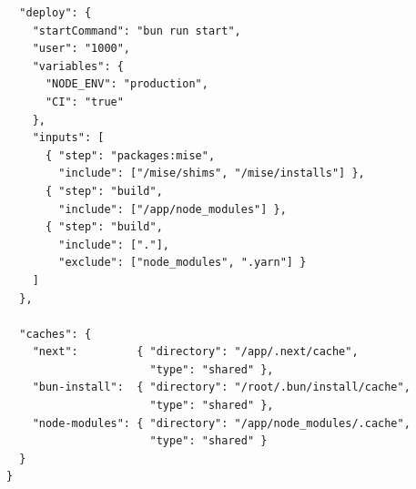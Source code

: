 \begin{longlisting}
\begin{mdframed}[
  linecolor=gray!40,
  backgroundcolor=gray!5,
  linewidth=0.5pt,
  innerleftmargin=6pt,
  innerrightmargin=6pt,
  innertopmargin=6pt,
  innerbottommargin=6pt,
  nobreak=false
]
\begin{verbatim}
  "deploy": {
    "startCommand": "bun run start",
    "user": "1000",
    "variables": {
      "NODE_ENV": "production",
      "CI": "true"
    },
    "inputs": [
      { "step": "packages:mise",
        "include": ["/mise/shims", "/mise/installs"] },
      { "step": "build",
        "include": ["/app/node_modules"] },
      { "step": "build",
        "include": ["."],
        "exclude": ["node_modules", ".yarn"] }
    ]
  },

  "caches": {
    "next":         { "directory": "/app/.next/cache",
                      "type": "shared" },
    "bun-install":  { "directory": "/root/.bun/install/cache",
                      "type": "shared" },
    "node-modules": { "directory": "/app/node_modules/.cache",
                      "type": "shared" }
  }
}
\end{verbatim}
\end{mdframed}
\caption{Extrait du plan \texttt{railpack-plan.json} -- Partie 2 : configuration de deploiement et caches}
\label{lst:railpack-plan-2}
\end{longlisting}



